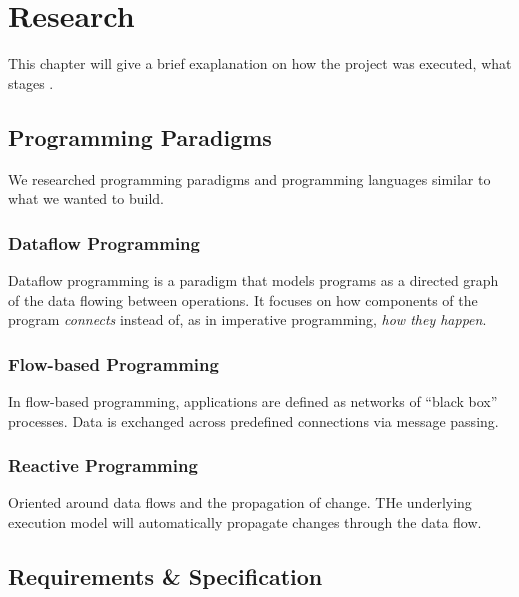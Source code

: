 \chapter{Research}
This chapter will give a brief exaplanation on how the project was
executed, what stages .




\section{Programming Paradigms}
We researched programming paradigms and programming languages similar
to what we wanted to build.

\subsection{Dataflow Programming}
Dataflow programming is a paradigm that models programs as a directed
graph of the data flowing between operations. It focuses on how
components of the program \emph{connects} instead of, as in imperative
programming, \emph{how they happen}. 

\subsection{Flow-based Programming}
In flow-based programming, applications are defined as networks of
``black box'' processes. Data is exchanged across predefined
connections via message passing. 

\subsection{Reactive Programming}
Oriented around data flows and the propagation of change. THe
underlying execution model will automatically propagate changes
through the data flow. 


\section{Requirements \& Specification}

